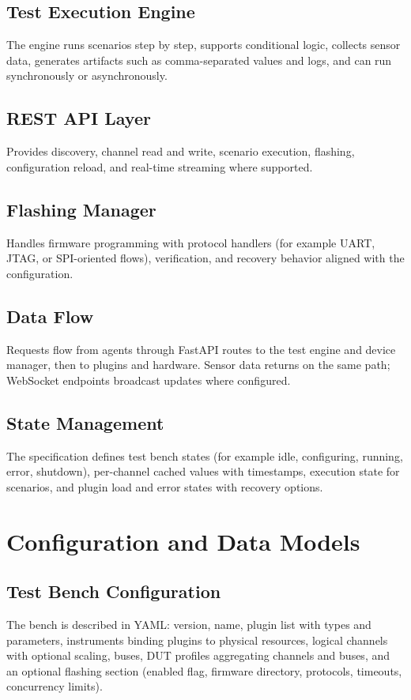 \documentclass[conference]{IEEEtran}
\begin{document}
\subsection{Test Execution Engine}
The engine runs scenarios step by step, supports conditional logic, collects sensor data, generates artifacts such as comma-separated values and logs, and can run synchronously or asynchronously.

\subsection{REST API Layer}
Provides discovery, channel read and write, scenario execution, flashing, configuration reload, and real-time streaming where supported.

\subsection{Flashing Manager}
Handles firmware programming with protocol handlers (for example UART, JTAG, or SPI-oriented flows), verification, and recovery behavior aligned with the configuration.

\subsection{Data Flow}
Requests flow from agents through FastAPI routes to the test engine and device manager, then to plugins and hardware. Sensor data returns on the same path; WebSocket endpoints broadcast updates where configured.

\subsection{State Management}
The specification defines test bench states (for example idle, configuring, running, error, shutdown), per-channel cached values with timestamps, execution state for scenarios, and plugin load and error states with recovery options.

\section{Configuration and Data Models}

\subsection{Test Bench Configuration}
The bench is described in YAML: version, name, plugin list with types and parameters, instruments binding plugins to physical resources, logical channels with optional scaling, buses, DUT profiles aggregating channels and buses, and an optional flashing section (enabled flag, firmware directory, protocols, timeouts, concurrency limits).
\end{document}
